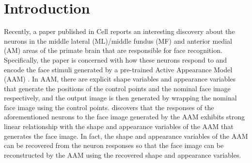 \documentclass{article}
\begin{document}
\section{Introduction}


Recently, a paper published in Cell \cite{chang2017code} reports an interesting discovery about the neurons in the middle lateral (ML)/middle fundus (MF) and anterior medial (AM) areas of the primate brain that are responsible for face recognition. Specifically, the paper is concerned with how these neurons respond to and encode the face stimuli generated by a pre-trained  Active Appearance Model (AAM) \cite{cootes2001active,cootes2015active}.  In AAM, there are explicit shape variables and appearance variables  that generate the positions of the control points and the nominal face image respectively, and the output image is then generated by wrapping the nominal face image using the control points.  \cite{chang2017code}  discovers that the responses of the aforementioned neurons  to the face image generated by the AAM exhibits strong linear relationship with the shape and appearance variables  of the AAM that generates the face image. In fact, the shape and appearance variables of the AAM can be recovered from the neuron responses so that the face image can be reconstructed by the AAM using the recovered shape and appearance variables.

\end{document}
